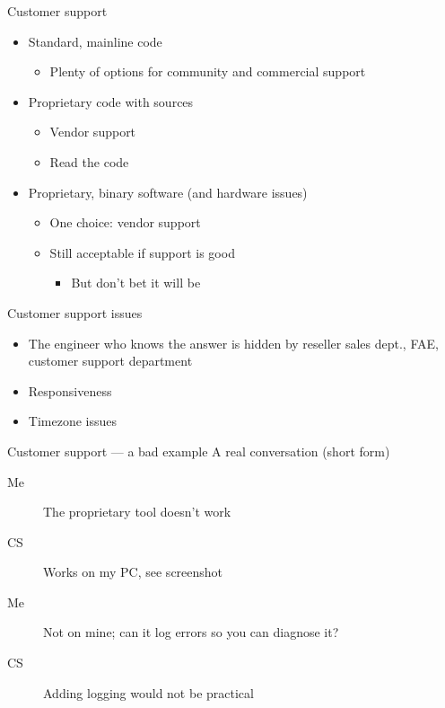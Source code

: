 \documentclass[xetex,table]{beamer}
\begin{document}
\begin{frame}{Customer support}
  \begin{itemize}
  \item Standard, mainline code
    \begin{itemize}
    \item Plenty of options for community and commercial support
    \end{itemize}
  \item Proprietary code with sources
    \begin{itemize}
    \item Vendor support
    \item Read the code
    \end{itemize}
  \item Proprietary, binary software (and hardware issues)
    \begin{itemize}
    \item One choice: vendor support
    \item Still acceptable if support is good
      \begin{itemize}
        \item But don't bet it will be
      \end{itemize}
    \end{itemize}
  \end{itemize}
\end{frame}

\begin{frame}{Customer support issues}
  \begin{itemize}
  \item The engineer who knows the answer is hidden by reseller
    sales dept., FAE, customer support department
  \item Responsiveness
  \item Timezone issues
  \end{itemize}
\end{frame}

\begin{frame}{Customer support --- a bad example}
  A real conversation (short form)
  \begin{description}
  \item[Me] The proprietary tool doesn't work
  \item[CS] Works on my PC, see screenshot
  \item[Me] Not on mine; can it log errors so you can diagnose it?
  \item[CS] Adding logging would not be practical
  \end{description}
\end{frame}
\end{document}
